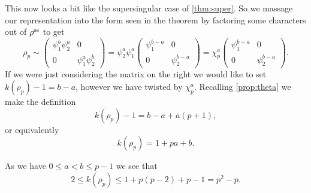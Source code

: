 \documentclass[a4paper,12pt]{article}
\begin{document}
This now looks a bit like the supersingular case of \cref{thm:super}.
So we massage our representation into the form seen in the theorem by factoring some characters out of $\rho^\text{ss}$ to get
\[
\rho_p \sim
\begin{pmatrix}
\psi_1^b\psi_2^a & 0 \\
0                & \psi_1^a\psi_2^b
\end{pmatrix} =
\psi_2^a\psi_1^a\begin{pmatrix}
\psi_1^{b-a} & 0 \\
0            & \psi_2^{b-a}
\end{pmatrix} =
\chi_p^a\begin{pmatrix}
\psi_1^{b-a} & 0 \\
0            & \psi_2^{b-a}
\end{pmatrix}.
\]
If we were just considering the matrix on the right we would like to set $k(\rho_p) - 1 = b - a$, however we have twisted by $\chi_p^a$.
Recalling \cref{prop:theta} we make the definition
\[
k(\rho_p) - 1 = b - a + a(p+1),
\]
or equivalently
\begin{equation}\label{eq:l2}
k(\rho_p) = 1 + pa + b.
\end{equation}

As we have $0 \le a< b \le p-1$ we see that
\[
2\le k(\rho_p) \le 1 + p(p-2) + p-1 = p^2-p.
\]
\end{document}
